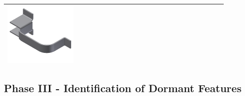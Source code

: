 \begin{minipage}[t]{0.9\linewidth}
\begin{tabular}[h]{@{} p{0.3\linewidth}| p{0.3\linewidth}|  p{0.3\linewidth}@{}}
\includegraphics[width=0.98\linewidth]{..//Common/images/DefeatBracketPhase_II_3} \\ \bottomrule

\end{tabular}
\label{fig:phaseII}
\end{minipage}

\subsection{Phase III - Identification of Dormant Features}\label{sec:dormant}

